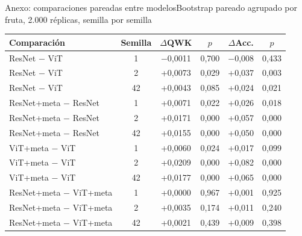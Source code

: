 \documentclass[aspectratio=169,11pt,table]{beamer}
\begin{document}
\begin{frame}{Anexo: comparaciones pareadas entre modelos}{Bootstrap pareado agrupado por fruta, 2.000 réplicas, semilla por semilla}
{\tiny
\centering
\begin{tabular}{lccccc}
\toprule
\rowcolor{verdeosc}\color{white}\bfseries Comparación & \color{white}\bfseries Semilla & \color{white}\bfseries $\Delta$QWK & \color{white}\bfseries $p$ & \color{white}\bfseries $\Delta$Acc. & \color{white}\bfseries $p$ \\
\midrule
ResNet $-$ ViT & 1 & $-$0{,}0011 & 0{,}700 & $-$0{,}008 & 0{,}433 \\
ResNet $-$ ViT & 2 & +0{,}0073 & 0{,}029 & +0{,}037 & 0{,}003 \\
ResNet $-$ ViT & 42 & +0{,}0043 & 0{,}085 & +0{,}024 & 0{,}021 \\
ResNet+meta $-$ ResNet & 1 & +0{,}0071 & 0{,}022 & +0{,}026 & 0{,}018 \\
ResNet+meta $-$ ResNet & 2 & +0{,}0171 & 0{,}000 & +0{,}057 & 0{,}000 \\
ResNet+meta $-$ ResNet & 42 & +0{,}0155 & 0{,}000 & +0{,}050 & 0{,}000 \\
ViT+meta $-$ ViT & 1 & +0{,}0060 & 0{,}024 & +0{,}017 & 0{,}099 \\
ViT+meta $-$ ViT & 2 & +0{,}0209 & 0{,}000 & +0{,}082 & 0{,}000 \\
ViT+meta $-$ ViT & 42 & +0{,}0177 & 0{,}000 & +0{,}065 & 0{,}000 \\
ResNet+meta $-$ ViT+meta & 1 & +0{,}0000 & 0{,}967 & +0{,}001 & 0{,}925 \\
ResNet+meta $-$ ViT+meta & 2 & +0{,}0035 & 0{,}174 & +0{,}011 & 0{,}240 \\
ResNet+meta $-$ ViT+meta & 42 & +0{,}0021 & 0{,}439 & +0{,}009 & 0{,}398 \\
\bottomrule
\end{tabular}
}
\end{frame}
\end{document}
